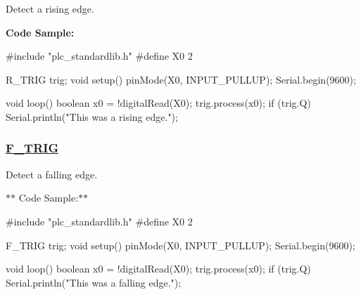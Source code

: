 Detect a rising edge.

{\bfseries Code Sample\+:} \begin{DoxyVerb}#include "plc_standardlib.h"
#define X0 2

R_TRIG trig;
void setup() {
    pinMode(X0, INPUT_PULLUP);
    Serial.begin(9600);
}

void loop() {
    boolean x0 = !digitalRead(X0);
    trig.process(x0);
    if (trig.Q) {
        Serial.println("This was a rising edge.");
    }
}
\end{DoxyVerb}


\subsubsection*{\hyperlink{class_f___t_r_i_g}{F\+\_\+\+T\+R\+I\+G}}

Detect a falling edge.

$\ast$$\ast$ Code Sample\+:$\ast$$\ast$ \begin{DoxyVerb}#include "plc_standardlib.h"
#define X0 2

F_TRIG trig;
void setup() {
    pinMode(X0, INPUT_PULLUP);
    Serial.begin(9600);
}

void loop() {
    boolean x0 = !digitalRead(X0);
    trig.process(x0);
    if (trig.Q) {
        Serial.println("This was a falling edge.");
    }
}\end{DoxyVerb}
 